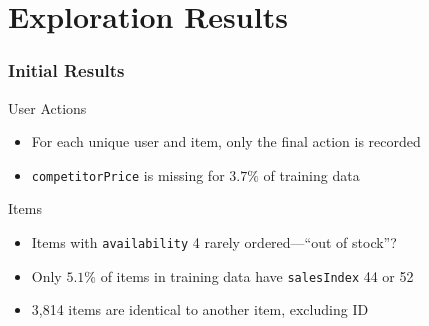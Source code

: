 \documentclass{beamer}
\begin{document}
\section{Exploration Results} %

\begin{frame}
  \frametitle{Initial Results}

  \begin{block}{User Actions}
  \begin{itemize}
    \item For each unique user and item, only the final action is recorded
    \item \texttt{competitorPrice} is missing for $3.7\%$ of training data
  \end{itemize}
  \end{block}

  \begin{block}{Items}
  \begin{itemize}
    \item Items with \texttt{availability} 4 rarely ordered---``out of stock''?
    \item Only $5.1\%$ of items in training data have \texttt{salesIndex} 44 or
    52
    \item 3,814 items are identical to another item, excluding ID
  \end{itemize}
  \end{block}
\end{frame}
\end{document}
